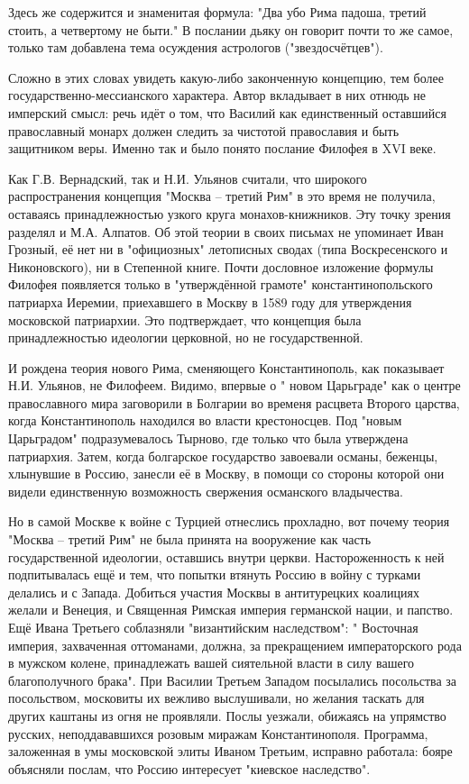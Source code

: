 \documentclass[a4paper, 12pt]{article}
\begin{document}
Здесь же содержится и знаменитая формула: "Два убо Рима падоша, третий стоить, а четвертому не быти." В послании дьяку он говорит почти то же самое, только там добавлена тема осуждения астрологов ("звездосчётцев").

Сложно в этих словах увидеть какую-либо законченную концепцию, тем более государственно-мессианского характера. Автор вкладывает в них отнюдь не имперский смысл: речь идёт о том, что Василий как единственный оставшийся православный монарх должен следить за чистотой православия и быть защитником веры. Именно так и было понято послание Филофея в XVI веке.

Как Г.В. Вернадский, так и Н.И. Ульянов считали, что широкого распространения концепция "Москва -- третий Рим" в это время не получила, оставаясь принадлежностью узкого круга монахов-книжников. Эту точку зрения разделял и М.А. Алпатов. Об этой теории в своих письмах не упоминает Иван Грозный, её нет ни в "официозных" летописных сводах (типа Воскресенского и Никоновского), ни в Степенной книге. Почти дословное изложение формулы Филофея появляется только в "утверждённой грамоте" константинопольского патриарха Иеремии, приехавшего в Москву в 1589 году для утверждения московской патриархии. Это подтверждает, что концепция была принадлежностью идеологии церковной, но не государственной.

И рождена теория нового Рима, сменяющего Константинополь, как показывает Н.И. Ульянов, не Филофеем. Видимо, впервые о " новом Царьграде" как о центре православного мира заговорили в Болгарии во временя расцвета Второго царства, когда Константинополь находился во власти крестоносцев. Под "новым Царьградом"  подразумевалось Тырново, где только что была утверждена патриархия. Затем, когда болгарское государство завоевали османы, беженцы, хлынувшие в Россию, занесли её в Москву, в помощи со стороны которой они видели единственную возможность свержения османского владычества.

Но в самой Москве к войне с Турцией отнеслись прохладно, вот почему теория "Москва -- третий Рим" не была принята на вооружение как часть государственной идеологии, оставшись внутри церкви. Настороженность к ней подпитывалась ещё и тем, что попытки втянуть Россию в войну с турками делались и с Запада. Добиться участия Москвы в антитурецких коалициях желали и Венеция, и Священная Римская империя германской нации, и папство. Ещё Ивана Третьего соблазняли "византийским наследством": " Восточная империя, захваченная оттоманами, должна, за прекращением императорского рода в мужском колене, принадлежать вашей сиятельной власти в силу вашего благополучного брака". При Василии Третьем Западом посылались посольства за посольством, московиты их вежливо выслушивали, но желания таскать для других каштаны из огня не проявляли. Послы уезжали, обижаясь на упрямство русских, неподдававшихся розовым миражам Константинополя. Программа, заложенная в умы московской элиты Иваном Третьим, исправно работала: бояре объясняли послам, что Россию интересует "киевское наследство".
\end{document}
